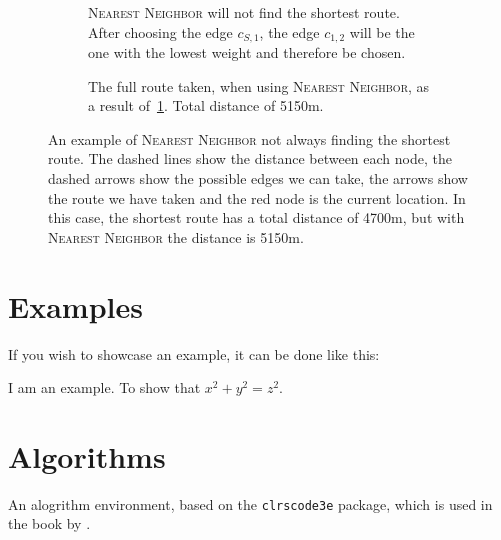 \documentclass[../../main.tex]{subfiles}
\begin{document}
\begin{figure}[htb!]
\begin{subfigure}[b]{0.45\textwidth}
    \caption{\textsc{Nearest Neighbor} will not find the shortest route.
    After choosing the edge $c_{S,1}$, the edge $c_{1,2}$ will be the one with the lowest weight and therefore be chosen.}
    \label{fig:nn-vs-optimal-3}
\end{subfigure}
\hfill
\begin{subfigure}[b]{0.45\textwidth}
    \caption{The full route taken, when using \textsc{Nearest Neighbor}, as a result of~\ref{fig:nn-vs-optimal-3}. Total distance of 5150m.}
    \label{fig:nn-vs-optimal-4}
\end{subfigure}
\caption{An example of \textsc{Nearest Neighbor} not always finding the shortest route.
The dashed lines show the distance between each node, the dashed arrows show the possible edges we can take, the arrows show the route we have taken and the red node is the current location.
In this case, the shortest route has a total distance of 4700m, but with \textsc{Nearest Neighbor} the distance is 5150m.}
\label{fig:nn-vs-optimal}
\end{figure}


\section{Examples}
If you wish to showcase an example, it can be done like this:

\begin{exa}
    I am an example. To show that $x^2 + y^2 = z^2$.
\end{exa}


\section{Algorithms}
An alogrithm environment, based on the \texttt{clrscode3e} package, which is used in the book  by \citeauthor{alg-book} \cite{alg-book}.
\end{document}
